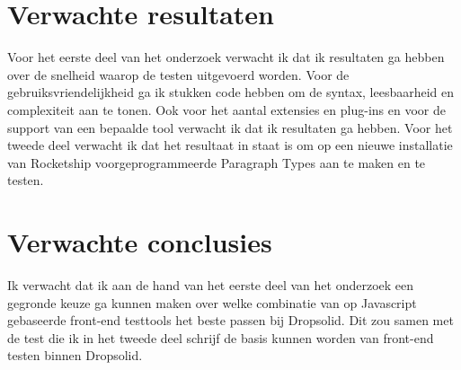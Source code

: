 \section{Verwachte resultaten}
\label{sec:verwachte_resultaten}

Voor het eerste deel van het onderzoek verwacht ik dat ik resultaten ga hebben over de snelheid waarop de testen uitgevoerd worden. Voor de gebruiksvriendelijkheid ga ik stukken code hebben om de syntax, leesbaarheid en complexiteit aan te tonen. Ook voor het aantal extensies en plug-ins en voor de support van een bepaalde tool verwacht ik dat ik resultaten ga hebben.
Voor het tweede deel verwacht ik dat het resultaat in staat is om op een nieuwe installatie van Rocketship voorgeprogrammeerde Paragraph Types aan te maken en te testen.

\section{Verwachte conclusies}
\label{sec:verwachte_conclusies}

Ik verwacht dat ik aan de hand van het eerste deel van het onderzoek een gegronde keuze ga kunnen maken over welke combinatie van op Javascript gebaseerde front-end testtools het beste passen bij Dropsolid. Dit zou samen met de test die ik in het tweede deel schrijf de basis kunnen worden van front-end testen binnen Dropsolid.

